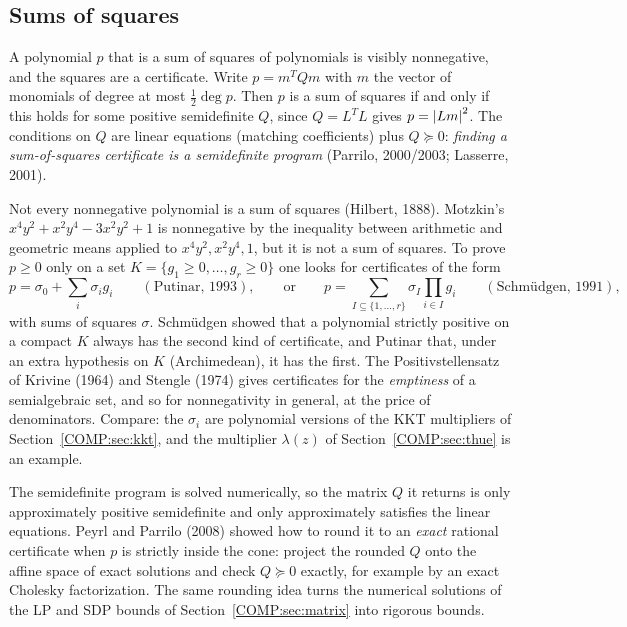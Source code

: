 \subsection{Sums of squares}
A polynomial $p$ that is a sum of squares of polynomials is visibly nonnegative, and the squares are a
certificate. Write $p=m^TQm$ with $m$ the vector of monomials of degree at most $\frac12\deg p$. Then $p$ is
a sum of squares if and only if this holds for some positive semidefinite $Q$, since $Q=L^TL$ gives
$p=\left\lvert Lm \right\rvert^2$. The conditions on $Q$ are linear equations (matching coefficients) plus $Q\succeq0$:
\emph{finding a sum-of-squares certificate is a semidefinite program} (Parrilo, 2000/2003; Lasserre, 2001).

Not every nonnegative polynomial is a sum of squares (Hilbert, 1888). Motzkin's
$x^4y^2+x^2y^4-3x^2y^2+1$ is nonnegative by the inequality between arithmetic and geometric means applied
to $x^4y^2,x^2y^4,1$, but it is not a sum of squares. To prove $p\ge0$ only on a set
$K=\{g_1\ge0,\dots,g_r\ge0\}$ one looks for certificates of the form
\[
  p=\sigma_0+\sum_i\sigma_ig_i\qquad(\text{Putinar, 1993}),\qquad\text{or}\qquad
  p=\sum_{I\subseteq\{1,\dots,r\}}\sigma_I\prod_{i\in I}g_i\qquad(\text{Schm\"udgen, 1991}),
\]
with sums of squares $\sigma$. Schm\"udgen showed that a polynomial strictly positive on a compact $K$ always
has the second kind of certificate, and Putinar that, under an extra hypothesis on $K$ (Archimedean), it has the
first. The Positivstellensatz of Krivine (1964) and Stengle (1974) gives certificates for the
\emph{emptiness} of a semialgebraic set, and so for nonnegativity in general, at the price of denominators.
Compare: the $\sigma_i$ are polynomial versions of the KKT multipliers of Section~\ref{COMP:sec:kkt}, and the
multiplier $\lambda(z)$ of Section~\ref{COMP:sec:thue} is an example.

The semidefinite program is solved numerically, so the matrix $Q$ it returns is only approximately positive
semidefinite and only approximately satisfies the linear equations. Peyrl and Parrilo (2008) showed how to
round it to an \emph{exact} rational certificate when $p$ is strictly inside the cone: project the rounded $Q$
onto the affine space of exact solutions and check $Q\succeq0$ exactly, for example by an exact Cholesky
factorization. The same rounding idea turns the numerical solutions of the LP and SDP bounds of
Section~\ref{COMP:sec:matrix} into rigorous bounds.

